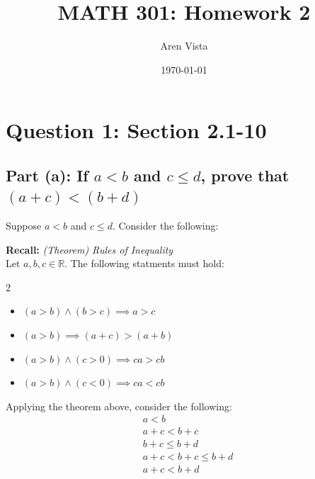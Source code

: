 \documentclass[11pt]{article}
\title{ MATH 301: Homework 2}
\author{ Aren Vista }
\date{\today}
\theoremstyle{plain}
\begin{document}
 \maketitle \pagebreak
\section*{Question 1: Section 2.1-10}
\subsection*{\textbf{Part (a):} If $a<b$ and $c \leq d$, prove that $(a+c)<(b+d)$}
Suppose $a<b$ and $c \leq d$. Consider the following:
\begin{blockquote}
	\textbf{Recall: } \textit{(Theorem) Rules of Inequality} \\
	$\text{Let } a,b,c \in \mathbb{R}$. The following statments must hold:
	\begin{multicols}{2}
		\begin{itemize}
			\item $(a>b) \land (b>c) \implies a>c$
			\item $(a>b) \implies (a+c) > (a+b)$
			\item $(a>b) \land (c>0) \implies ca > cb$
			\item $(a>b) \land (c<0) \implies ca < cb$
		\end{itemize}
	\end{multicols}
\end{blockquote} \noindent
Applying the theorem above, consider the following:
\[
	\begin{aligned}
		 & a<b                 \\
		 & a+c < b+c           \\
		 & b+c \leq  b+d       \\
		 & a+c < b+c \leq  b+d \\
		 & a+c <  b+d          \\
	\end{aligned}
\]
\end{document}
